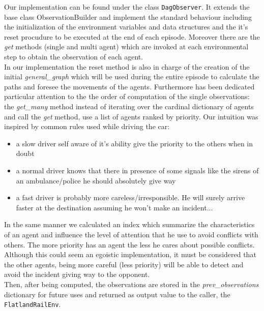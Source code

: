 Our implementation can be found under the class \texttt{DagObserver}. It extends the base class ObservationBuilder and implement the standard behaviour including the initialization of the environment variables and data structures and the it's reset procudure to be executed at the end of each episode. Moreover there are the \textit{get} methods (single and multi agent) which are invoked at each environmental step to obtain the observation of each agent.\\
In our implementation the reset method is also in charge of the creation of the initial \textit{general\_graph} which will be used during the entire episode to calculate the paths and foresee the movements of the agents. Furthermore has been dedicated particular attention to the the order of computation of the single observations: the \textit{get\_many} method instead of iterating over the cardinal dictionary of agents and call the \textit{get} method, use a list of agents ranked by priority. Our intuition was inspired by common rules used while driving the car:
\begin{itemize}
    \item a slow driver self aware of it's ability give the priority to the others when in doubt
    \item a normal driver knows that there in presence of some signals like the sirens of an ambulance/police he should absolutely give way
    \item a fast driver is probably more careless/irresponsible. He will surely arrive faster at the destination assuming he won't make an incident...
\end{itemize}
In the same manner we calculated an index which summarize the characteristics of an agent and influence the level of attention that he use to avoid conflicts with others. The more priority has an agent the less he cares about possible conflicts. Although this could seem an egoistic implementation, it must be considered that the other agents, being more careful (less priority) will be able to detect and avoid the incident giving way to the opponent.\\
Then, after being computed, the observations are stored in the \textit{prev\_observations} dictionary for future uses and returned as output value to the caller, the  \texttt{FlatlandRailEnv}.



